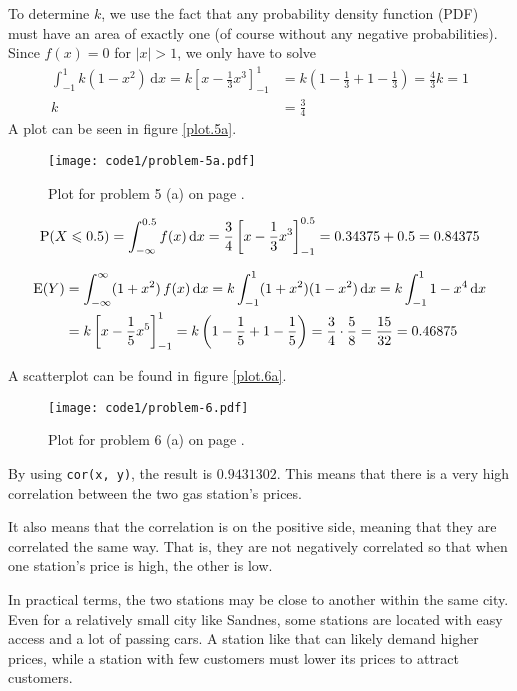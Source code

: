 \documentclass[a4paper,english,12pt]{article}
\begin{document}
To determine $k$, we use the fact that any probability density function (PDF)
must have an area of exactly one (of course without any negative
probabilities). Since $f(x) = 0$ for $|x| > 1$, we only have to solve
\begin{align*}
  \int_{-1}^{1}k(1-x^2)\, \mathrm{d}x =
  k\left[ x - \frac{1}{3}{x^3} \right]_{-1}^{1} &=
  k\left( 1 - \frac{1}{3} + 1 - \frac{1}{3} \right) = \frac{4}{3}k = 1 \\
   k &= \frac{3}{4}
\end{align*}
A plot can be seen in figure \vref{plot.5a}.
\begin{figure}[H]
  \texttt{[image: code1/problem-5a.pdf]}
  \caption{Plot for problem 5 (a) on page \pageref{problem.5 (a)}.}
  \label{plot.5a}
\end{figure}

\[
  \mathrm{P}(X \leqslant 0.5) = 
    \int_{-\infty}^{0.5} f(x)\, \mathrm{d}x =
  \frac{3}{4}\left[ x - \frac{1}{3}{x^3} \right]_{-1}^{0.5} =
    0.34375 + 0.5 = 0.84375
\]

\begin{align*}
  \mathrm{E}(Y) &=
    \int_{-\infty}^{\infty} (1+x^2)\, f(x)\, \mathrm{d}x =
    k\int_{-1}^{1} (1+x^2)(1-x^2) \, \mathrm{d}x =
    k\int_{-1}^{1} 1 - x^4 \, \mathrm{d}x \\ &=
    k\left[ x - \frac{1}{5} x^5 \right]_{-1}^{1} =
    k\left( 1 - \frac{1}{5} + 1 - \frac{1}{5} \right) = \frac{3}{4}\cdot\frac{5}{8}
      = \frac{15}{32} = 0.46875
\end{align*}

A scatterplot can be found in figure \vref{plot.6a}.
\begin{figure}[H]
  \texttt{[image: code1/problem-6.pdf]}
  \caption{Plot for problem 6 (a) on page \pageref{problem.6 (a)}.}
  \label{plot.6a}
\end{figure}

By using \texttt{cor(x, y)}, the result is $0.9431302$. This means that there
is a very high correlation between the two gas station's prices.

It also means that the correlation is on the positive side, meaning that they
are correlated the same way. That is, they are not negatively correlated so
that when one station's price is high, the other is low.

In practical terms, the two stations may be close to another within the same
city. Even for a relatively small city like Sandnes, some stations are located
with easy access and a lot of passing cars. A station like that can likely
demand higher prices, while a station with few customers must lower its prices
to attract customers.
\end{document}
